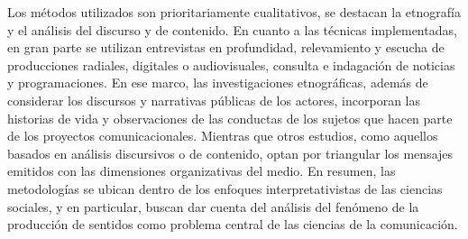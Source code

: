 \documentclass{tufte-handout}
\begin{document}
Los métodos utilizados son prioritariamente cualitativos, se destacan la
etnografía y el análisis del discurso y de contenido. En cuanto a las
técnicas implementadas, en gran parte se utilizan entrevistas en
profundidad, relevamiento y escucha de producciones radiales, digitales
o audiovisuales, consulta e indagación de noticias y programaciones. En
ese marco, las investigaciones etnográficas, además de considerar los
discursos y narrativas públicas de los actores, incorporan las historias
de vida y observaciones de las conductas de los sujetos que hacen parte
de los proyectos comunicacionales. Mientras que otros estudios, como
aquellos basados en análisis discursivos o de contenido, optan por
triangular los mensajes emitidos con las dimensiones organizativas del
medio. En resumen, las metodologías se ubican dentro de los enfoques
interpretativistas de las ciencias sociales, y en particular, buscan dar
cuenta del análisis del fenómeno de la producción de sentidos como
problema central de las ciencias de la comunicación.
\end{document}
